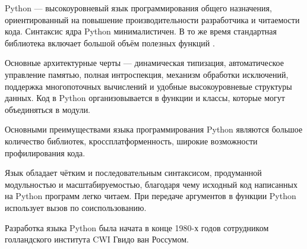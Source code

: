 Python --- высокоуровневый язык программирования общего назначения, ориентированный на повышение производительности разработчика и читаемости кода. Синтаксис ядра Python минималистичен. В то же время стандартная библиотека включает большой объём полезных функций \cite{python_wiki}. 


Основные архитектурные черты — динамическая типизация, автоматическое управление памятью, полная интроспекция, механизм обработки исключений, поддержка многопоточных вычислений и удобные высокоуровневые структуры данных. Код в Python организовывается в функции и классы, которые могут объединяться в модули.

Основными преимуществами языка программирования Python являются большое количество библиотек, кроссплатформенность, широкие возможности профилирования кода. 

Язык обладает чётким и последовательным синтаксисом, продуманной модульностью и масштабируемостью, благодаря чему исходный код написанных на Python программ легко читаем. При передаче аргументов в функции Python использует вызов по соиспользованию.

Разработка языка Python была начата в конце 1980-х годов сотрудником голландского института CWI Гвидо ван Россумом.